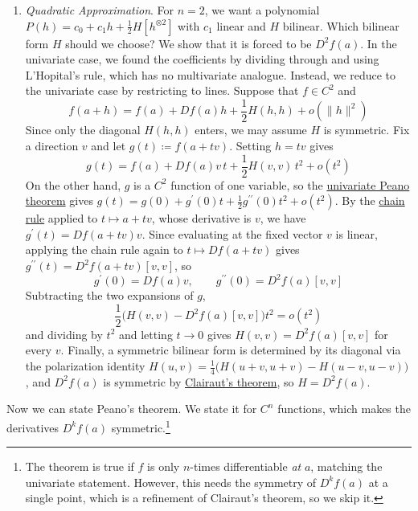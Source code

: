 \begin{enumerate}
    \item \textit{Quadratic Approximation}. For $n = 2$, we want a polynomial $P(h) = c_0 + c_1 h + \frac{1}{2} H[h^{\otimes 2}]$ with $c_1$ linear and $H$ bilinear. Which bilinear form $H$ should we choose? We show that it is forced to be $D^2 f(a)$. In the univariate case, we found the coefficients by dividing through and using L'Hopital's rule, which has no multivariate analogue. Instead, we reduce to the univariate case by restricting to lines. Suppose that $f \in C^2$ and 
    \begin{equation}
      f(a + h) = f(a) + Df(a) h + \frac{1}{2} H(h, h) + o(\|h\|^2)
    \end{equation}
    Since only the diagonal $H(h, h)$ enters, we may assume $H$ is symmetric. Fix a direction $v$ and let $g(t) \coloneqq f(a + tv)$. Setting $h = tv$ gives 
    \begin{equation}
      g(t) = f(a) + Df(a) v \, t + \frac{1}{2} H(v, v) \, t^2 + o(t^2)
    \end{equation}
    On the other hand, $g$ is a $C^2$ function of one variable, so the \hyperref[real-thm:taylor-peano]{univariate Peano theorem} gives $g(t) = g(0) + g^\prime(0) t + \frac{1}{2} g^{\prime\prime}(0) t^2 + o(t^2)$. By the \hyperref[thm:chain-rule]{chain rule} applied to $t \mapsto a + tv$, whose derivative is $v$, we have $g^\prime (t) = Df(a + tv) v$. Since evaluating at the fixed vector $v$ is linear, applying the chain rule again to $t \mapsto Df(a + tv)$ gives $g^{\prime\prime}(t) = D^2 f(a + tv) [v, v]$, so 
    \begin{equation}
      g^\prime (0) = Df(a) v, \qquad g^{\prime\prime}(0) = D^2 f(a) [v, v]
    \end{equation}
    Subtracting the two expansions of $g$, 
    \begin{equation}
      \frac{1}{2} \big( H(v, v) - D^2 f(a) [v, v] \big) t^2 = o(t^2) 
    \end{equation}
    and dividing by $t^2$ and letting $t \to 0$ gives $H(v, v) = D^2 f(a) [v, v]$ for every $v$. Finally, a symmetric bilinear form is determined by its diagonal via the polarization identity $H(u, v) = \frac{1}{4} \big( H(u + v, u + v) - H(u - v, u - v) \big)$, and $D^2 f(a)$ is symmetric by \hyperref[thm:clairuts-theorem]{Clairaut's theorem}, so $H = D^2 f(a)$. 
  \end{enumerate}

  Now we can state Peano's theorem. We state it for $C^n$ functions, which makes the derivatives $D^k f(a)$ symmetric.\footnote{The theorem is true if $f$ is only $n$-times differentiable \textit{at} $a$, matching the univariate statement. However, this needs the symmetry of $D^k f(a)$ at a single point, which is a refinement of Clairaut's theorem, so we skip it.} 

